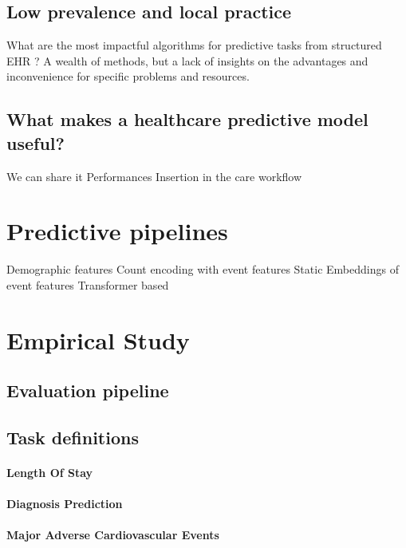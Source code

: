 \documentclass{report}
\begin{document}
\subsection{Low prevalence and local practice}\label{subsec:predictive_models:low_prevalence}

What are the most impactful algorithms for predictive tasks from structured EHR ?
A wealth of methods, but a lack of insights on the advantages and inconvenience for specific problems and resources.

\subsection{What makes a healthcare predictive model useful?}\label{subsec:predictive_models:useful}

We can share it
Performances
Insertion in the care workflow


\section{Predictive pipelines}\label{sec:predictive_models:pipelines}

Demographic features
Count encoding with event features
Static Embeddings of event features
Transformer based
\section{Empirical Study}\label{sec:predictive_models:empirical_study}
\subsection{Evaluation pipeline}\label{subsec:predictive_models:evaluation_pipeline}
\subsection{Task definitions}\label{subsec:predictive_models:task_definitions}

\paragraph{Length Of Stay}
\paragraph{Diagnosis Prediction}
\paragraph{Major Adverse Cardiovascular Events}
\end{document}
